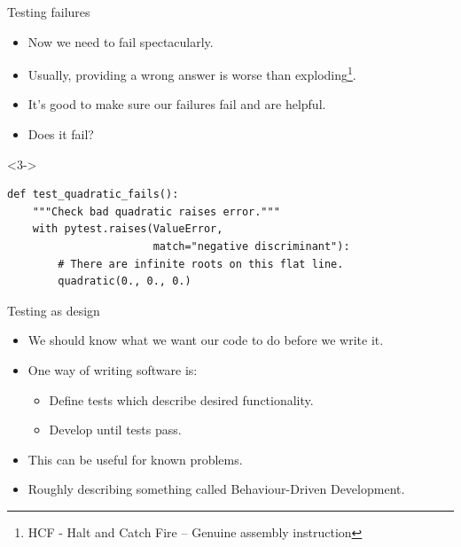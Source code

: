\documentclass[usenames,dvipsnames]{beamer}
\begin{document}
\begin{frame}[fragile]{Testing failures}
    \begin{itemize}[<+->]
        \item{}Now we need to fail spectacularly.
        \item{}Usually, providing a wrong answer is worse than exploding\footnote{HCF - Halt and Catch Fire -- Genuine assembly instruction}.
        \item{}It's good to make sure our failures fail and are helpful.
        \item{}Does it fail?
    \end{itemize}

    \begin{onlyenv}<3->
        \begin{lstlisting}[basicstyle=\scriptsize]
def test_quadratic_fails():
    """Check bad quadratic raises error."""
    with pytest.raises(ValueError, 
                       match="negative discriminant"):
        # There are infinite roots on this flat line.
        quadratic(0., 0., 0.)
        \end{lstlisting}
    \end{onlyenv}
\end{frame}

\begin{frame}{Testing as design}
    \begin{itemize}[<+->]
        \item{}We should know what we want our code to do before we write it.
        \item{}One way of writing software is:
        \begin{itemize}
            \item{}Define tests which describe desired functionality.
            \item{}Develop until tests pass.
        \end{itemize}
        \item{}This can be useful for known problems.
        \item{}{\scriptsize Roughly describing something called Behaviour-Driven Development.}
    \end{itemize}
\end{frame}
\end{document}

